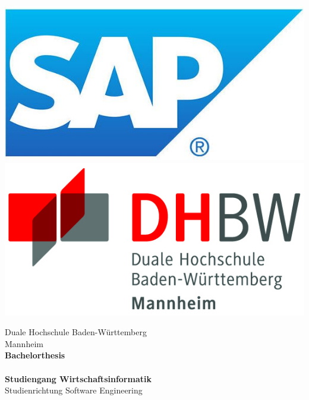 \begin{titlepage}
\begin{minipage}{\textwidth}
		\vspace{-2cm}
		\noindent \includegraphics[scale=0.27]{img/sap.jpg} \hfill   \includegraphics{img/logo.jpg}
\end{minipage}
\vspace{1em}
\sffamily
\begin{center}
	\textsf{\large{}Duale Hochschule Baden-W\"urttemberg\\[1.5mm] Mannheim}\\[2em]
	\textsf{\textbf{\Large{}Bachelorthesis}}\\[7mm]
	\textsf{\textbf{\Large{}\DerTitelDerArbeit}} \\[1.5cm]
	
	\textsf{\textbf{\Large{}Studiengang Wirtschaftsinformatik}\\[3mm] \textsf{Studienrichtung Software Engineering}}\\
	

\end{center}
\end{titlepage}
